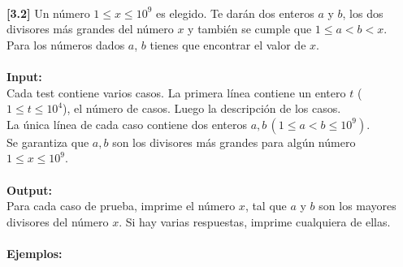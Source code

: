 \\
\textbf{[3.2]} Un número $1\leq x \leq 10^9$ es elegido. Te darán dos enteros $a$ y $b$, los dos divisores más grandes del número $x$ y también se cumple que $1\leq a < b < x$.
\\
Para los números dados $a$, $b$ tienes que encontrar el valor de $x$.
\\\\
\textbf{Input:}
\\
Cada test contiene varios casos. La primera línea contiene un entero $t$ ($1\leq t \leq 10^4$), el número de casos. Luego la descripción de los casos.
\\ La única línea de cada caso contiene dos enteros $a,b \, (1 \leq a < b \leq 10^9)$.
\\ Se garantiza que $a,b$ son los divisores más grandes para algún número $1\leq x\leq 10^9$.
\\\\
\textbf{Output:}
\\
Para cada caso de prueba, imprime el número $x$, tal que $a$ y $b$ son los mayores divisores del número $x$.
Si hay varias respuestas, imprime cualquiera de ellas.
\\\\
\textbf{Ejemplos:}
